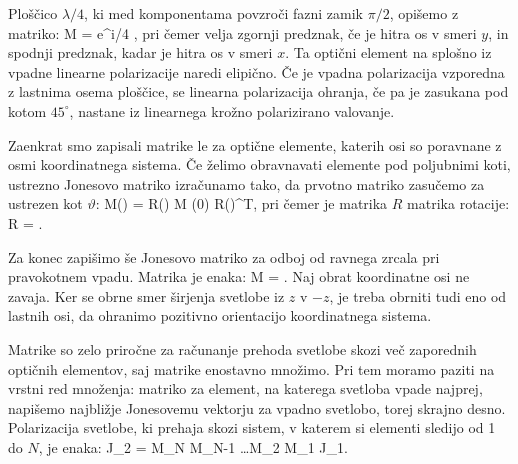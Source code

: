 Ploščico $\lambda/4$, ki med komponentama povzroči fazni zamik $\pi/2$, opišemo z matriko:
\beq
M = e^{\pm i\pi/4}
\left[\begin{array}{cc}
1 & 0 \\
0 & \mp i\\
\end{array}\right]\!\!,
\label{eq:03_56}
\eeq
pri čemer velja zgornji predznak, če je hitra os v smeri $y$, in spodnji predznak, kadar
je hitra os v smeri $x$. Ta optični element na splošno iz vpadne linearne
polarizacije naredi elipično. Če je vpadna polarizacija vzporedna z
lastnima osema ploščice, se linearna polarizacija ohranja, če pa je
zasukana pod kotom $45^\circ$, nastane iz linearnega krožno polarizirano valovanje. 

Zaenkrat smo zapisali matrike le za optične elemente, katerih osi so poravnane z osmi
koordinatnega sistema. Če želimo obravnavati elemente pod poljubnimi koti, 
ustrezno Jonesovo matriko izračunamo tako, da prvotno matriko zasučemo za ustrezen kot $\vartheta$:
\beq
M(\vartheta) = R(\vartheta) \cdot M (0) \cdot R(\vartheta)^{T},
\label{eq:03_57}
\eeq
pri čemer je matrika $R$ matrika rotacije:
\beq
R = \!\!.
\label{eq:03_58}
\eeq

Za konec zapišimo še Jonesovo matriko za odboj od ravnega zrcala pri
pravokotnem vpadu. Matrika je enaka:
\beq
M = \left[\begin{array}{cc}
1 & 0 \\
0 & -1\\
\end{array}\right]\!\!.
\label{eq:03_59}
\eeq
Naj obrat koordinatne osi ne zavaja. Ker se obrne smer 
širjenja svetlobe iz $z$ v $-z$, je treba obrniti tudi eno od lastnih osi, 
da ohranimo pozitivno orientacijo koordinatnega sistema. 

Matrike so zelo priročne za računanje prehoda svetlobe skozi več
zaporednih optičnih elementov, saj matrike enostavno množimo. Pri tem 
moramo paziti na vrstni red množenja: matriko za element, na katerega
svetloba vpade najprej, napišemo najbližje Jonesovemu vektorju za vpadno svetlobo, 
torej skrajno desno. Polarizacija svetlobe, ki prehaja skozi sistem, 
v katerem si elementi sledijo od 1 do $N$, je enaka:
\beq
J_2 = M_N \cdot M_{N-1} \dots M_2 \cdot M_1 \cdot J_1.
\label{eq:03_60}
\eeq

